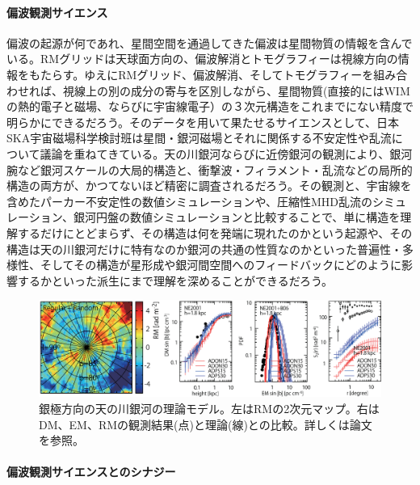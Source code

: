 \paragraph{偏波観測サイエンス}

偏波の起源が何であれ、星間空間を通過してきた偏波は星間物質の情報を含んでいる。RMグリッドは天球面方向の、偏波解消とトモグラフィーは視線方向の情報をもたらす。ゆえにRMグリッド、偏波解消、そしてトモグラフィーを組み合わせれば、視線上の別の成分の寄与を区別しながら、星間物質(直接的にはWIMの熱的電子と磁場、ならびに宇宙線電子）の３次元構造をこれまでにない精度で明らかにできるだろう。そのデータを用いて果たせるサイエンスとして、日本SKA宇宙磁場科学検討班は星間・銀河磁場とそれに関係する不安定性や乱流について議論を重ねてきている。天の川銀河ならびに近傍銀河の観測により、銀河腕など銀河スケールの大局的構造と、衝撃波・フィラメント・乱流などの局所的構造の両方が、かつてないほど精密に調査されるだろう。その観測と、宇宙線を含めたパーカー不安定性の数値シミュレーションや、圧縮性MHD乱流のシミュレーション、銀河円盤の数値シミュレーションと比較することで、単に構造を理解するだけにとどまらず、その構造は何を発端に現れたのかという起源や、その構造は天の川銀河だけに特有なのか銀河の共通の性質なのかといった普遍性・多様性、そしてその構造が星形成や銀河間空間へのフィードバックにどのように影響するかといった派生にまで理解を深めることができるだろう。

\begin{figure}[tbp]
\begin{center}
\includegraphics[width=1.0\linewidth]{ISM/c08.s3.ss6.f1.eps}
\caption{
銀極方向の天の川銀河の理論モデル。左はRMの2次元マップ。右はDM、EM、RMの観測結果(点)と理論(線)との比較。詳しくは論文を参照\citep{2013ApJ...767..150A}。
}\label{c08.s3.ss6.f1}
\end{center}
\end{figure}

\paragraph{偏波観測サイエンスとのシナジー}

